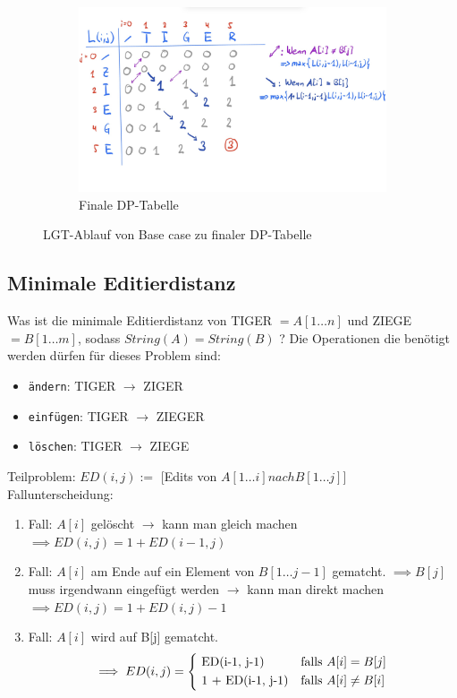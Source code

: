 \documentclass[a4paper]{article}
\begin{document}
\begin{figure}[h]
\begin{subfigure}{0.7\textwidth}
 \includegraphics[width=\textwidth]{Pictures/LGT2.jpg}
        \caption{Finale DP-Tabelle}
        \label{fig:LGT02}
\end{subfigure}
\caption{LGT-Ablauf von Base case zu finaler DP-Tabelle}
\label{fig:LGT-Ablauf}
\end{figure}

\subsection{Minimale Editierdistanz}
Was ist die minimale Editierdistanz von \textsc{TIGER} $= A[1\dots n]$ und \textsc{ZIEGE} $= B[1\dots m]$, sodass $String(A) = String(B)$ ?
Die Operationen die benötigt werden dürfen für dieses Problem sind:
\begin{itemize}
    \item \texttt{ändern}: TIGER $\rightarrow$ ZIGER
    \item \texttt{einfügen}: TIGER $\rightarrow$ ZIEGER
    \item \texttt{löschen}: TIGER $\rightarrow$ ZIEGE    
\end{itemize}

Teilproblem: $ED(i, j) :=$ [Edits von $A[1\dots i] nach B[1\dots j]$] \\

Fallunterscheidung:
\begin{enumerate}
    \item Fall: $A[i]$ gelöscht $\rightarrow$ kann man gleich machen $\implies ED(i, j) = 1 + ED(i-1, j)$ 
    \item Fall: $A[i]$ am Ende auf ein Element von $B[1\dots j-1]$ gematcht. $\implies B[j]$ muss irgendwann eingefügt werden $\rightarrow$ kann man direkt machen $\implies ED(i, j) = 1 + ED(i, j)-1$
    \item Fall: $A[i]$ wird auf B[j] gematcht. 
    \begin{equation*}
    \implies ED(i, j)  =
        \begin{cases*}
           $ ED(i-1, j-1)$ &  falls $ A[i] = B[j] $\\
           $ 1 + ED(i-1, j-1)$ &  falls $ A[i] \neq B[i]$ 
        \end{cases*}
    \end{equation*}
\end{enumerate}
\end{document}
